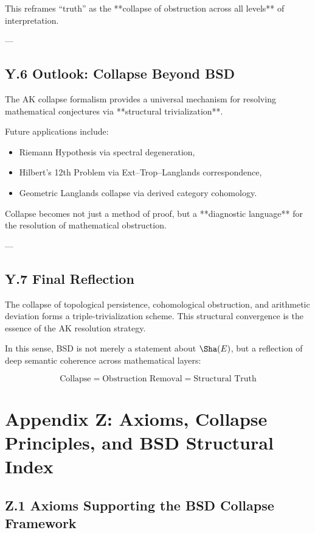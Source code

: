 This reframes “truth” as the **collapse of obstruction across all levels** of interpretation.

---

\subsection*{Y.6 Outlook: Collapse Beyond BSD}

The AK collapse formalism provides a universal mechanism  
for resolving mathematical conjectures via **structural trivialization**.  

Future applications include:
\begin{itemize}
  \item Riemann Hypothesis via spectral degeneration,
  \item Hilbert’s 12th Problem via Ext–Trop–Langlands correspondence,
  \item Geometric Langlands collapse via derived category cohomology.
\end{itemize}

Collapse becomes not just a method of proof,  
but a **diagnostic language** for the resolution of mathematical obstruction.

---

\subsection*{Y.7 Final Reflection}

The collapse of topological persistence, cohomological obstruction,  
and arithmetic deviation forms a triple-trivialization scheme.  
This structural convergence is the essence of the AK resolution strategy.

In this sense, BSD is not merely a statement about \( \Sha(E) \),  
but a reflection of deep semantic coherence across mathematical layers:

\[
\text{Collapse} = \text{Obstruction Removal} = \text{Structural Truth}
\]





\section*{Appendix Z: Axioms, Collapse Principles, and BSD Structural Index}

\subsection*{Z.1 Axioms Supporting the BSD Collapse Framework}

